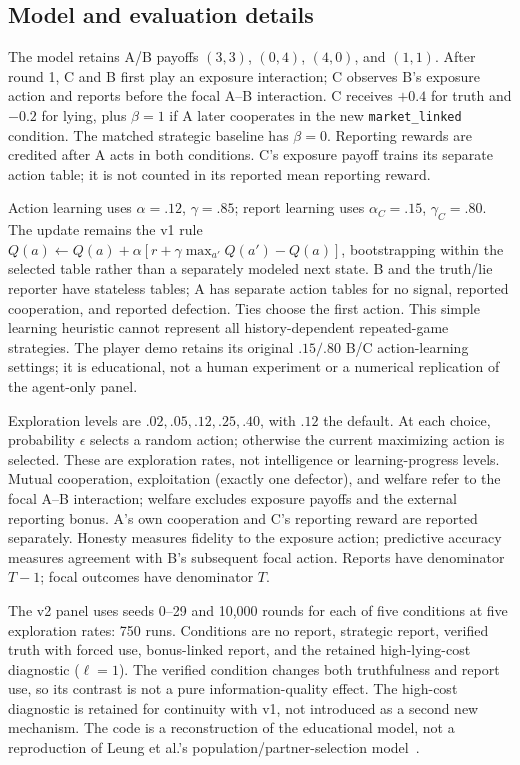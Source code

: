 \subsection*{Model and evaluation details}
The model retains A/B payoffs $(3,3)$, $(0,4)$, $(4,0)$, and $(1,1)$. After round 1, C and B first play an exposure interaction; C observes B's exposure action and reports before the focal A--B interaction. C receives $+0.4$ for truth and $-0.2$ for lying, plus $\beta=1$ if A later cooperates in the new \texttt{market\_linked} condition. The matched strategic baseline has $\beta=0$. Reporting rewards are credited after A acts in both conditions. C's exposure payoff trains its separate action table; it is not counted in its reported mean reporting reward.

Action learning uses $\alpha=.12$, $\gamma=.85$; report learning uses $\alpha_C=.15$, $\gamma_C=.80$. The update remains the v1 rule $Q(a)\leftarrow Q(a)+\alpha[r+\gamma\max_{a'}Q(a')-Q(a)]$, bootstrapping within the selected table rather than a separately modeled next state. B and the truth/lie reporter have stateless tables; A has separate action tables for no signal, reported cooperation, and reported defection. Ties choose the first action. This simple learning heuristic cannot represent all history-dependent repeated-game strategies. The player demo retains its original $.15/.80$ B/C action-learning settings; it is educational, not a human experiment or a numerical replication of the agent-only panel.

Exploration levels are $.02,.05,.12,.25,.40$, with $.12$ the default. At each choice, probability $\epsilon$ selects a random action; otherwise the current maximizing action is selected. These are exploration rates, not intelligence or learning-progress levels. Mutual cooperation, exploitation (exactly one defector), and welfare refer to the focal A--B interaction; welfare excludes exposure payoffs and the external reporting bonus. A's own cooperation and C's reporting reward are reported separately. Honesty measures fidelity to the exposure action; predictive accuracy measures agreement with B's subsequent focal action. Reports have denominator $T-1$; focal outcomes have denominator $T$.

The v2 panel uses seeds 0--29 and 10,000 rounds for each of five conditions at five exploration rates: 750 runs. Conditions are no report, strategic report, verified truth with forced use, bonus-linked report, and the retained high-lying-cost diagnostic ($\ell=1$). The verified condition changes both truthfulness and report use, so its contrast is not a pure information-quality effect. The high-cost diagnostic is retained for continuity with v1, not introduced as a second new mechanism. The code is a reconstruction of the educational model, not a reproduction of Leung et al.'s population/partner-selection model~\cite{leung2026}.

